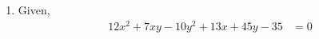 \renewcommand{\theequation}{\theenumi}
\begin{enumerate}[label=\thesection.\arabic*.,ref=\thesection.\theenumi]


\item 
Given,
\begin{align}
    12x^2+7xy-10y^2+13x+45y-35&=0 
\label{eq:pair_given}
\end{align}


\end{enumerate}
